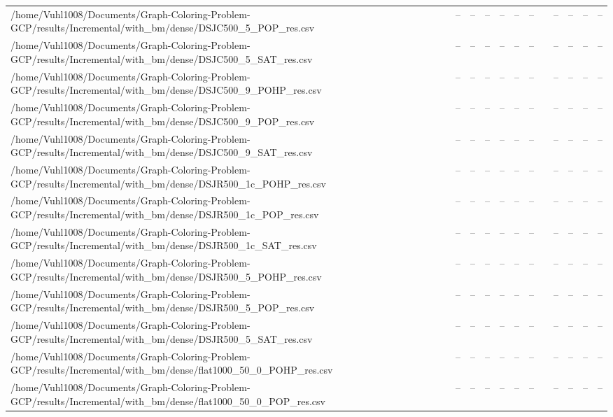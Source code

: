 \begin{table}[htbp]
\begin{tabular}{llllllllllll}
/home/Vuhl1008/Documents/Graph-Coloring-Problem-GCP/results/Incremental/with\_bm/dense/DSJC500\_5\_POP\_res.csv & -- & -- & -- & -- & -- & -- & {} & -- & -- & -- & -- \\
/home/Vuhl1008/Documents/Graph-Coloring-Problem-GCP/results/Incremental/with\_bm/dense/DSJC500\_5\_SAT\_res.csv & -- & -- & -- & -- & -- & -- & {} & -- & -- & -- & -- \\
/home/Vuhl1008/Documents/Graph-Coloring-Problem-GCP/results/Incremental/with\_bm/dense/DSJC500\_9\_POHP\_res.csv & -- & -- & -- & -- & -- & -- & {} & -- & -- & -- & -- \\
/home/Vuhl1008/Documents/Graph-Coloring-Problem-GCP/results/Incremental/with\_bm/dense/DSJC500\_9\_POP\_res.csv & -- & -- & -- & -- & -- & -- & {} & -- & -- & -- & -- \\
/home/Vuhl1008/Documents/Graph-Coloring-Problem-GCP/results/Incremental/with\_bm/dense/DSJC500\_9\_SAT\_res.csv & -- & -- & -- & -- & -- & -- & {} & -- & -- & -- & -- \\
/home/Vuhl1008/Documents/Graph-Coloring-Problem-GCP/results/Incremental/with\_bm/dense/DSJR500\_1c\_POHP\_res.csv & -- & -- & -- & -- & -- & -- & {} & -- & -- & -- & -- \\
/home/Vuhl1008/Documents/Graph-Coloring-Problem-GCP/results/Incremental/with\_bm/dense/DSJR500\_1c\_POP\_res.csv & -- & -- & -- & -- & -- & -- & {} & -- & -- & -- & -- \\
/home/Vuhl1008/Documents/Graph-Coloring-Problem-GCP/results/Incremental/with\_bm/dense/DSJR500\_1c\_SAT\_res.csv & -- & -- & -- & -- & -- & -- & {} & -- & -- & -- & -- \\
/home/Vuhl1008/Documents/Graph-Coloring-Problem-GCP/results/Incremental/with\_bm/dense/DSJR500\_5\_POHP\_res.csv & -- & -- & -- & -- & -- & -- & {} & -- & -- & -- & -- \\
/home/Vuhl1008/Documents/Graph-Coloring-Problem-GCP/results/Incremental/with\_bm/dense/DSJR500\_5\_POP\_res.csv & -- & -- & -- & -- & -- & -- & {} & -- & -- & -- & -- \\
/home/Vuhl1008/Documents/Graph-Coloring-Problem-GCP/results/Incremental/with\_bm/dense/DSJR500\_5\_SAT\_res.csv & -- & -- & -- & -- & -- & -- & {} & -- & -- & -- & -- \\
/home/Vuhl1008/Documents/Graph-Coloring-Problem-GCP/results/Incremental/with\_bm/dense/flat1000\_50\_0\_POHP\_res.csv & -- & -- & -- & -- & -- & -- & {} & -- & -- & -- & -- \\
/home/Vuhl1008/Documents/Graph-Coloring-Problem-GCP/results/Incremental/with\_bm/dense/flat1000\_50\_0\_POP\_res.csv & -- & -- & -- & -- & -- & -- & {} & -- & -- & -- & -- \\

\end{tabular}
\end{table}

